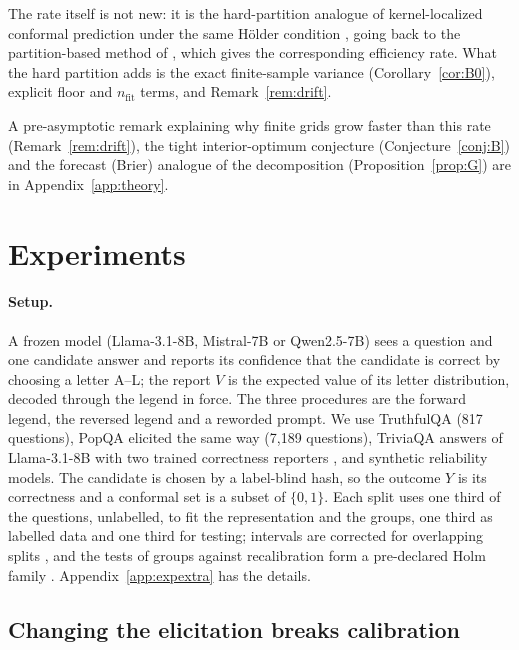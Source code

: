 \documentclass[twoside]{article}
\theoremstyle{definition}
\theoremstyle{remark}
\newcommand{\1}{\mathbf{1}}
\begin{document}
The rate itself is not new: it is the hard-partition analogue of kernel-localized conformal
prediction under the same H\"older condition \citep{conrad2026beyond,min2026unified}, going back to
the partition-based method of \citet{lei2014distribution}, which gives the corresponding efficiency rate. What the hard partition adds is the
exact finite-sample variance (Corollary~\ref{cor:B0}), explicit floor and $n_{\mathrm{fit}}$ terms, and
Remark~\ref{rem:drift}.

A pre-asymptotic remark explaining why finite grids grow faster than this rate (Remark~\ref{rem:drift}),
the tight interior-optimum conjecture (Conjecture~\ref{conj:B}) and the forecast (Brier) analogue of the
decomposition (Proposition~\ref{prop:G}) are in Appendix~\ref{app:theory}.

\section{Experiments}
\label{sec:experiments}
\paragraph{Setup.} A frozen model (Llama-3.1-8B, Mistral-7B or Qwen2.5-7B) sees a question and one candidate
answer and reports its confidence that the candidate is correct by choosing a letter A--L; the report $V$ is the
expected value of its letter distribution, decoded through the legend in force. The three procedures are the
forward legend, the reversed legend and a reworded prompt. We use TruthfulQA \citep{lin2022truthfulqa} (817
questions), PopQA \citep{mallen2023popqa} elicited the same way (7{,}189 questions), TriviaQA answers of
Llama-3.1-8B with two trained correctness reporters \citep{joshi2017triviaqa}, and synthetic reliability models.
The candidate is chosen by a label-blind hash, so the outcome $Y$ is its correctness and a conformal set is a
subset of $\{0,1\}$. Each split uses one third of the questions, unlabelled, to fit the representation and the
groups, one third as labelled data and one third for testing; intervals are corrected for overlapping splits
\citep{nadeau2003inference}, and the tests of groups against recalibration form a pre-declared Holm family
\citep{holm1979simple}. Appendix~\ref{app:expextra} has the details.

\subsection{Changing the elicitation breaks calibration}
\label{sec:exp-break}
\end{document}
